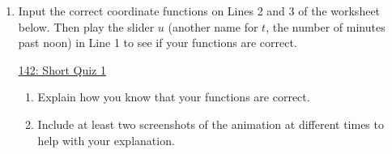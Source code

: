\documentclass{ximera}
\begin{document}
\begin{question}
\begin{enumerate}
\item Input the correct coordinate functions on Lines 2 and 3 of the worksheet below. Then play the slider $u$ (another name for $t$, the number of minutes past noon) in Line 1 to see if your functions are correct. 

\begin{onlineOnly}
    \begin{center}
\end{center}
\end{onlineOnly}

\href{https://www.desmos.com/calculator/lkrunhfgxi}{142: Short Quiz 1}

\begin{enumerate}
\item Explain how you know that your functions are correct.

\item Include at least two screenshots of the animation at different times to help with your explanation.
\end{enumerate}
\end{enumerate}

\end{question}
\end{document}

